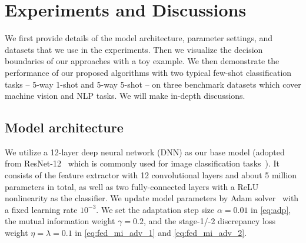 \section{Experiments and Discussions}
\label{sec:exp}
We first provide details of the model architecture, parameter settings, and datasets that we use in the experiments.
Then we visualize the decision boundaries of our approaches with a toy example. We then demonstrate the performance of our proposed algorithms with two typical few-shot classification tasks -- 5-way 1-shot and 5-way 5-shot -- on three benchmark datasets which cover machine vision and NLP tasks. We will make in-depth discussions.

\subsection{Model architecture} 
We utilize a 12-layer deep neural network (DNN) as our base model (adopted from ResNet-12~\cite{he2016deep} which is commonly used for image classification tasks~\cite{sun2019mtl, oreshkin2018tadam, zhang2018metagan}).
It consists of the feature extractor with 12 convolutional layers and about 5 million parameters in total, as well as two fully-connected layers with a ReLU nonlinearity as the classifier. We update model parameters by Adam solver~\cite{kingma2014adam} with a fixed learning rate $10^{-3}$. We
set the adaptation step size $\alpha=0.01$ in \eqref{eq:adp}, the mutual information weight $\gamma=0.2$, and the stage-1/-2 discrepancy loss weight $\eta=\lambda=0.1$ in \eqref{eq:fed_mi_adv_1} and \eqref{eq:fed_mi_adv_2}.




